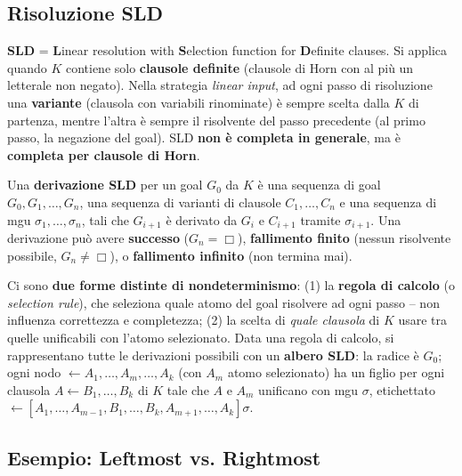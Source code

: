 \documentclass[a4paper,11pt]{article}
\begin{document}
\subsection{Risoluzione SLD}

\textbf{SLD} = \textbf{L}inear resolution with \textbf{S}election function for \textbf{D}efinite clauses. Si applica quando $K$ contiene solo \textbf{clausole definite} (clausole di Horn con al più un letterale non negato). Nella strategia \emph{linear input}, ad ogni passo di risoluzione una \textbf{variante} (clausola con variabili rinominate) è sempre scelta dalla $K$ di partenza, mentre l'altra è sempre il risolvente del passo precedente (al primo passo, la negazione del goal). SLD \textbf{non è completa in generale}, ma è \textbf{completa per clausole di Horn}.

Una \textbf{derivazione SLD} per un goal $G_0$ da $K$ è una sequenza di goal $G_0,G_1,\ldots,G_n$, una sequenza di varianti di clausole $C_1,\ldots,C_n$ e una sequenza di mgu $\sigma_1,\ldots,\sigma_n$, tali che $G_{i+1}$ è derivato da $G_i$ e $C_{i+1}$ tramite $\sigma_{i+1}$. Una derivazione può avere \textbf{successo} ($G_n=\Box$), \textbf{fallimento finito} (nessun risolvente possibile, $G_n\neq\Box$), o \textbf{fallimento infinito} (non termina mai).

Ci sono \textbf{due forme distinte di nondeterminismo}: (1) la \textbf{regola di calcolo} (o \emph{selection rule}), che seleziona quale atomo del goal risolvere ad ogni passo -- non influenza correttezza e completezza; (2) la scelta di \emph{quale clausola} di $K$ usare tra quelle unificabili con l'atomo selezionato. Data una regola di calcolo, si rappresentano tutte le derivazioni possibili con un \textbf{albero SLD}: la radice è $G_0$; ogni nodo $\leftarrow A_1,\ldots,A_m,\ldots,A_k$ (con $A_m$ atomo selezionato) ha un figlio per ogni clausola $A\leftarrow B_1,\ldots,B_k$ di $K$ tale che $A$ e $A_m$ unificano con mgu $\sigma$, etichettato $\leftarrow[A_1,\ldots,A_{m-1},B_1,\ldots,B_k,A_{m+1},\ldots,A_k]\sigma$.

\subsection{Esempio: Leftmost vs. Rightmost}
\end{document}

